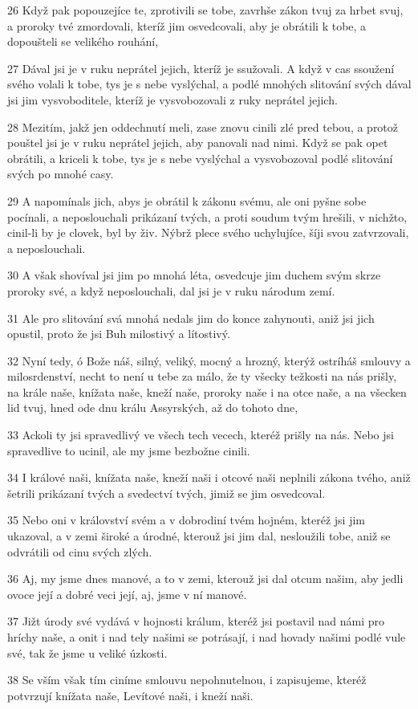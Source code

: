 \par 26 Když pak popouzejíce te, zprotivili se tobe, zavrhše zákon tvuj za hrbet svuj, a proroky tvé zmordovali, kteríž jim osvedcovali, aby je obrátili k tobe, a dopoušteli se velikého rouhání,
\par 27 Dával jsi je v ruku neprátel jejich, kteríž je ssužovali. A když v cas ssoužení svého volali k tobe, tys je s nebe vyslýchal, a podlé mnohých slitování svých dával jsi jim vysvoboditele, kteríž je vysvobozovali z ruky neprátel jejich.
\par 28 Mezitím, jakž jen oddechnutí meli, zase znovu cinili zlé pred tebou, a protož pouštel jsi je v ruku neprátel jejich, aby panovali nad nimi. Když se pak opet obrátili, a kriceli k tobe, tys je s nebe vyslýchal a vysvobozoval podlé slitování svých po mnohé casy.
\par 29 A napomínals jich, abys je obrátil k zákonu svému, ale oni pyšne sobe pocínali, a neposlouchali prikázaní tvých, a proti soudum tvým hrešili, v nichžto, cinil-li by je clovek, byl by živ. Nýbrž plece svého uchylujíce, šíji svou zatvrzovali, a neposlouchali.
\par 30 A však shovíval jsi jim po mnohá léta, osvedcuje jim duchem svým skrze proroky své, a když neposlouchali, dal jsi je v ruku národum zemí.
\par 31 Ale pro slitování svá mnohá nedals jim do konce zahynouti, aniž jsi jich opustil, proto že jsi Buh milostivý a lítostivý.
\par 32 Nyní tedy, ó Bože náš, silný, veliký, mocný a hrozný, kterýž ostríháš smlouvy a milosrdenství, necht to není u tebe za málo, že ty všecky težkosti na nás prišly, na krále naše, knížata naše, kneží naše, proroky naše i na otce naše, a na všecken lid tvuj, hned ode dnu králu Assyrských, až do tohoto dne,
\par 33 Ackoli ty jsi spravedlivý ve všech tech vecech, kteréž prišly na nás. Nebo jsi spravedlive to ucinil, ale my jsme bezbožne cinili.
\par 34 I králové naši, knížata naše, kneží naši i otcové naši neplnili zákona tvého, aniž šetrili prikázaní tvých a svedectví tvých, jimiž se jim osvedcoval.
\par 35 Nebo oni v království svém a v dobrodiní tvém hojném, kteréž jsi jim ukazoval, a v zemi široké a úrodné, kterouž jsi jim dal, nesloužili tobe, aniž se odvrátili od cinu svých zlých.
\par 36 Aj, my jsme dnes manové, a to v zemi, kterouž jsi dal otcum našim, aby jedli ovoce její a dobré veci její, aj, jsme v ní manové.
\par 37 Jižt úrody své vydává v hojnosti králum, kteréž jsi postavil nad námi pro hríchy naše, a onit i nad tely našimi se potrásají, i nad hovady našimi podlé vule své, tak že jsme u veliké úzkosti.
\par 38 Se vším však tím ciníme smlouvu nepohnutelnou, i zapisujeme, kteréž potvrzují knížata naše, Levítové naši, i kneží naši.

